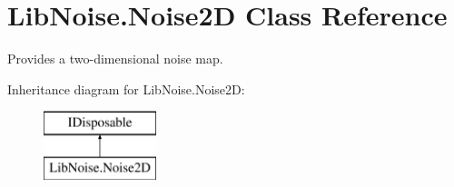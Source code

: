 \hypertarget{class_lib_noise_1_1_noise2_d}{}\section{Lib\+Noise.\+Noise2D Class Reference}
\label{class_lib_noise_1_1_noise2_d}


Provides a two-\/dimensional noise map.  


Inheritance diagram for Lib\+Noise.\+Noise2D\+:\begin{figure}[H]
\begin{center}
\leavevmode
\includegraphics[height=2.000000cm]{class_lib_noise_1_1_noise2_d}
\end{center}
\end{figure}
